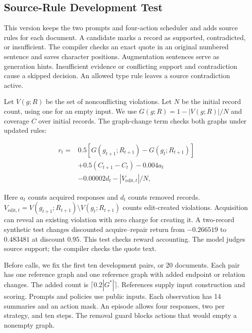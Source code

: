 \subsection{Source-Rule Development Test}

\label{app:docred_v2}

This version keeps the two prompts and four-action scheduler and adds
source rules for each document. A candidate marks a record as supported,
contradicted, or insufficient. The compiler checks an exact quote in
an original numbered sentence and saves character positions.
Augmentation sentences serve as generation hints. Insufficient evidence
or conflicting support and contradiction cause a skipped decision.
An allowed type rule leaves a source contradiction active.

Let $V(g;R)$ be the set of nonconflicting violations. Let $N$ be the
initial record count, using one for an empty input.
We use $G(g;R)=1-|V(g;R)|/N$ and coverage $C$ over initial records.
The graph-change term checks both graphs under updated rules:

\begin{align}
r_t={}&0.5\left[G(g_{t+1};R_{t+1})-G(g_t;R_{t+1})\right] \nonumber\\
&+0.5(C_{t+1}-C_t)-0.004a_t \nonumber\\
&-0.00002d_t-|V_{\mathrm{edit},t}|/N,
\end{align}

Here $a_t$ counts acquired responses and $d_t$ counts removed records.
$V_{\mathrm{edit},t}=V(g_{t+1};R_{t+1})\setminus V(g_t;R_{t+1})$ counts
edit-created violations. Acquisition can reveal an existing violation
with zero charge for creating it. A two-record synthetic test changes
discounted acquire--repair return from $-0.266519$ to $0.483481$
at discount $0.95$. This test checks reward accounting. The model judges
source support; the compiler checks the quote text.

Before calls, we fix the first ten development pairs, or 20 documents.
Each pair has one reference graph and one reference graph with added
endpoint or relation changes. The added count is $\lceil0.2|G^*|\rceil$.
References supply input construction and scoring. Prompts and policies
use public inputs. Each observation has 14 summaries and an action mask.
An episode allows four responses, two per strategy, and ten steps.
The removal guard blocks actions that would empty a nonempty graph.

